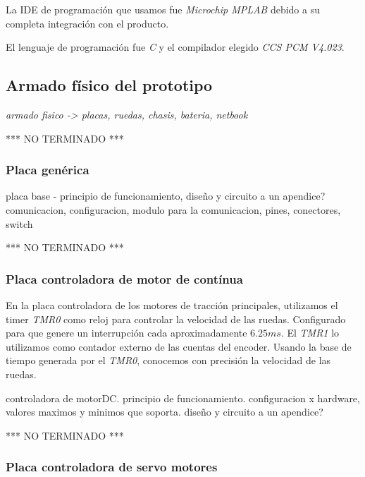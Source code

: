 La IDE de programaci\'on que usamos fue \emph{Microchip MPLAB} debido a su completa integraci\'on con el producto.

El lenguaje de programaci\'on fue \emph{C} y el compilador elegido \emph{CCS PCM V4.023}.

\subsection{Armado f\'isico del prototipo}
\label{Harmado}

\emph{armado fisico -> placas, ruedas, chasis, bateria, netbook}




*** NO TERMINADO ***




\subsubsection{Placa gen\'erica}
\label{HAPgenerica}

placa base - principio de funcionamiento, diseño y circuito a un apendice?
comunicacion, configuracion, modulo para la comunicacion, pines, conectores, switch




*** NO TERMINADO ***





\subsubsection{Placa controladora de motor de cont\'inua}
\label{HAPmotorDC}

En la placa controladora de los motores de tracci\'on principales, utilizamos el timer \emph{TMR0} como reloj para controlar la
velocidad de las ruedas. Configurado para que genere un interrupci\'on cada aproximadamente $6.25 ms$. El \emph{TMR1} lo utilizamos como
contador externo de las cuentas del encoder. Usando la base de tiempo generada por el \emph{TMR0}, conocemos con precisi\'on la velocidad
de las ruedas.


controladora de motorDC.
principio de funcionamiento.
configuracion x hardware, valores maximos y minimos que soporta.
diseño y circuito a un apendice?






*** NO TERMINADO ***



\subsubsection{Placa controladora de servo motores}
\label{HAPservos}

